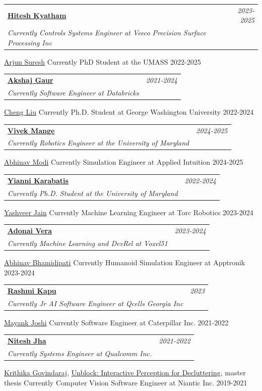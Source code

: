 \documentclass[a4paper,11pt]{article}
\makeatletter
\newcommand{\resumeProject}[4]{
\vspace{0.5mm}\item
    \begin{tabular*}{0.98\textwidth}[t]{l@{\extracolsep{\fill}}r}
        \textbf{#1} & \textit{\footnotesize{#3}} \\
        \footnotesize{\textit{#2}} & \footnotesize{#4}
    \end{tabular*}
    \vspace{-2.4mm}
}
\makeatother
\begin{document}
\resumeProject
  {\href{https://www.linkedin.com/in/hiteshkyatham/}{Hitesh Kyatham}}
  {Currently Controls Systems Engineer at Veeco Precision Surface Processing Inc}
  {2023-2025}

\resumeProject
  {\href{https://www.linkedin.com/in/arjun-suresh-4bb96b28a/}{Arjun Suresh}}
  {Currently PhD Student at the UMASS}
  {2022-2025}

\resumeProject
  {\href{https://www.linkedin.com/in/akshajgaur/}{Akshaj Gaur}}
  {Currently Software Engineer at Databricks}
  {2021-2024}

\resumeProject
  {\href{https://www.linkedin.com/in/chengliu2023/}{Cheng Liu}}
  {Currently Ph.D. Student at George Washington University}
  {2022-2024}

\resumeProject
  {\href{https://www.linkedin.com/in/vivek-mange/}{Vivek Mange}}
  {Currently Robotics Engineer at the University of Maryland}
  {2024-2025}

\resumeProject
  {\href{https://www.linkedin.com/in/abhinavmodi16/}{Abhinav Modi}}
  {Currently Simulation Engineer at Applied Intuition}
  {2024-2025}

\resumeProject
  {\href{https://www.linkedin.com/in/yianni-karabatis/}{Yianni Karabatis}}
  {Currently Ph.D. Student at the University of Maryland}
  {2022-2024}

\resumeProject
  {\href{https://www.linkedin.com/in/yashveerjain/}{Yashveer Jain}}
  {Currently Machine Learning Engineer at Torc Robotics}
  {2023-2024}

\resumeProject
  {\href{https://www.linkedin.com/in/adonai-vera/}{Adonai Vera}}
  {Currently Machine Learning and DevRel at Voxel51}
  {2023-2024}

\resumeProject
  {\href{https://www.linkedin.com/in/abhinav-bhamidipati/?originalSubdomain=in}{Abhinav Bhamidipati}}
  {Currently Humanoid Simulation Engineer at Apptronik}
  {2023-2024}

\resumeProject
  {\href{https://www.linkedin.com/in/rashmi-kapu/}{Rashmi Kapu}}
  {Currently Jr AI Software Engineer at Qcells Georgia Inc}
  {2023}

\resumeProject
  {\href{https://www.linkedin.com/in/mjoshi07/}{Mayank Joshi}}
  {Currently Software Engineer at Caterpillar Inc.}
  {2021-2022}

\resumeProject
  {\href{https://www.linkedin.com/in/nitesh-jha08/}{Nitesh Jha}}
  {Currently Systems Engineer at Qualcomm Inc.}
  {2021-2022}

\resumeProject
  {\href{https://www.linkedin.com/in/krithika-govindaraj/}{Krithika Govindaraj}, \href{https://www.proquest.com/pqdtglobal1/dissertations-theses/unblock-interactive-perception-decluttering/docview/2583936235/sem-2?accountid=14696}{Unblock: Interactive Perception for Decluttering}, master thesis}
  {Currently Computer Vision Software Engineer at Niantic Inc.}
  {2019-2021}
\end{document}
